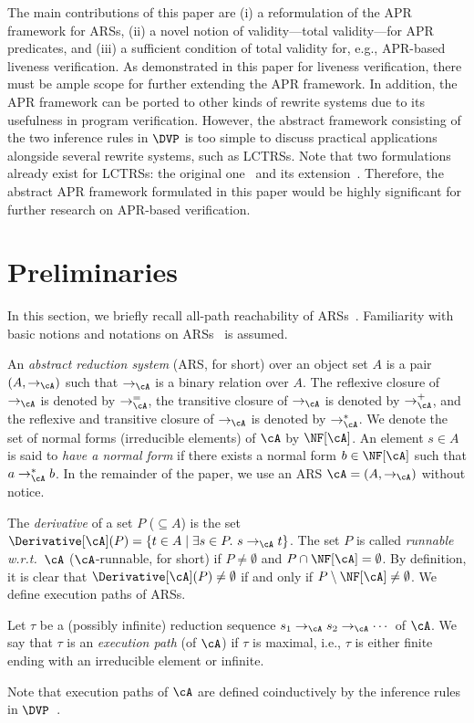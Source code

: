 The main contributions of this paper are
(i)
a reformulation of the APR framework for ARSs,
(ii)
a novel notion of validity---total validity---for APR predicates,
and
(iii)
a sufficient condition of total validity for, e.g., APR-based liveness verification.
As demonstrated in this paper for liveness verification, there must be ample scope for further extending the APR framework.
In addition, the APR framework can be ported to other kinds of rewrite systems due to its usefulness in program verification.
However, the abstract framework consisting of the two inference rules in $\DVP$ is too simple to discuss practical applications alongside several rewrite systems, such as LCTRSs.
Note that two formulations already exist for LCTRSs:
the original one~\cite{KN13frocos} and its extension~\cite{CL18}.
Therefore, the abstract APR framework formulated in this paper would be highly significant for further research on APR-based verification.

\setcounter{section}{1}
\section{Preliminaries}
\label{sec:preliminaries}

In this section, we briefly recall all-path reachability of ARSs~\cite{CL18}.
Familiarity with basic notions and notations on ARSs~\cite{BN98,Ohl02} is assumed.

An \emph{abstract reduction system} (ARS, for short) over an object set $A$ is a pair $(A,\to_\cA)$ such that $\to_\cA$ is a binary relation over $A$.
The reflexive closure of $\to_\cA$ is denoted by $\to_\cA^=$,
the transitive closure of $\to_\cA$ is denoted by $\to_\cA^+$, and
the reflexive and transitive closure of $\to_\cA$ is denoted by $\to_\cA^*$.
We denote the set of normal forms (irreducible elements) of $\cA$ by $\NF[\cA]$.
An element $s \in A$ is said to \emph{have a normal form} if there exists a normal form $b \in \NF[\cA]$ such that $a \mathrel{\to_\cA^*} b$.
In the remainder of the paper, we use an ARS $\cA = (A,\to_\cA)$ without notice.

The \emph{derivative} of a set $P$ ($\subseteq A$) is the set $\Derivative[\cA](P) = \{ t \in A \mid \exists s \in P.\ s \to_\cA t \}$.
The set $P$ is called \emph{runnable w.r.t.\ $\cA$} ($\cA$-runnable, for short) if $P\ne \emptyset$ and $P \cap \NF[\cA] = \emptyset$.
By definition, it is clear that $\Derivative[\cA](P)\ne\emptyset$ if and only if $P \setminus \NF[\cA] \ne \emptyset$.
We define execution paths of ARSs.
\begin{definition}
	Let $\tau$ be a (possibly infinite) reduction sequence $s_1 \to_\cA s_2 \to_\cA \cdots$  of $\cA$.
	We say that $\tau$ is an \emph{execution path} (of $\cA$) if $\tau$ is maximal, i.e., $\tau$ is either finite ending with an irreducible element or infinite.
\end{definition}
Note that execution paths of $\cA$ are defined coinductively by the inference rules in $\DVP$~\cite{CL18}.

